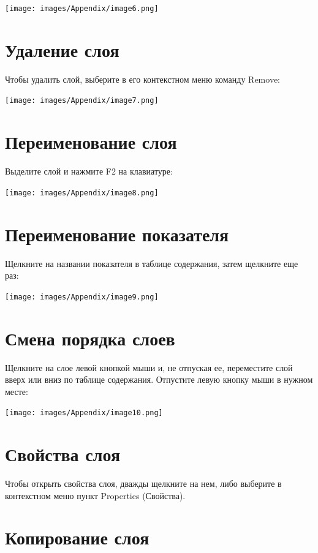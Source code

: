 \documentclass[12pt,]{book}
\begin{document}
\texttt{[image: images/Appendix/image6.png]}

\hypertarget{section-9}{%
\section{Удаление слоя}\label{section-9}}

Чтобы удалить слой, выберите в его контекстном меню команду Remove:

\texttt{[image: images/Appendix/image7.png]}

\hypertarget{section-10}{%
\section{Переименование слоя}\label{section-10}}

Выделите слой и нажмите F2 на клавиатуре:

\texttt{[image: images/Appendix/image8.png]}

\hypertarget{section-11}{%
\section{Переименование показателя}\label{section-11}}

Щелкните на названии показателя в таблице содержания, затем щелкните еще раз:

\texttt{[image: images/Appendix/image9.png]}

\hypertarget{section-12}{%
\section{Смена порядка слоев}\label{section-12}}

Щелкните на слое левой кнопкой мыши и, не отпуская ее, переместите слой вверх или вниз по таблице содержания. Отпустите левую кнопку мыши в нужном месте:

\texttt{[image: images/Appendix/image10.png]}

\hypertarget{section-13}{%
\section{Свойства слоя}\label{section-13}}

Чтобы открыть свойства слоя, дважды щелкните на нем, либо выберите в контекстном меню пункт Properties (Свойства).

\hypertarget{section-14}{%
\section{Копирование слоя}\label{section-14}}
\end{document}
